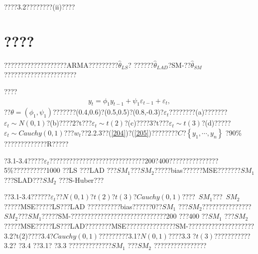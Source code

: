 \documentclass[a4paper,12pt,openany,oneside,utf-8]{ctexbook}
\begin{document}
	\noindent ????3.2????????(ii)????
	
	\section{????}
	
	???????????????????ARMA?????????$\hat{\theta}_{LS}$? ??????$\hat{\theta}_{LAD}$?SM-??$\hat{\theta}_{SM}$ ??????????????????????
	
	????
	\begin{align}\label{343}
		y_{t}=\phi_{1} y_{t-1}+\psi_{1} \varepsilon_{t-1}+\varepsilon_{t},
	\end{align}
	??$\theta=(\phi_{1},\psi_{1})$???????(0.4,0.6)?(0.5,0.5)?(0.8,-0.3)?$\varepsilon_{t}$????????(a)???????$\varepsilon_{t}\sim N(0,1)$?(b)????2?t???$\varepsilon_{t}\sim t(2)$?(c)????3?t???$\varepsilon_{t}\sim t(3)$?(d)?????$\varepsilon_{t}\sim Cauchy(0,1)$???$w_t$??2.2.3??(\ref{204})?(\ref{205})????????$C$?$\left\{y_1,\cdots,y_n\right\}$ ?90\% ?????????????R?????
	
	?3.1-3.4?????$\varepsilon_t$?????????????????????????????200?400???????????????5\%??????????1000 ??LS ???LAD ???$SM_1$???$SM_2$?????bias??????MSE???????$SM_1$???SLAD???$SM_2$ ???S-Huber???
	
	??3.1-3.4??????$\varepsilon_t$??$N(0,1)$?$t(2)$?$t(3)$?$Cauchy(0,1)$????~$SM_1$???~$SM_2$ ?????MSE?????LS???LAD ??????????bias??????0??$SM_1$ ???$SM_2$???????????????$SM_2$???$SM_1$?????SM-?????????????????????????????200 ???400 ??$SM_1$ ???$SM_2$ ?????MSE?????LS???LAD????????MSE???????????????SM-????????????????????3.2?t(2)????3.4?$Cauchy(0,1)$?????????3.1?$N(0,1)$????3.3 ?$t(3)$???????????3.2? ?3.4 ??3.1? ?3.3 ?????????????$SM_1$ ???$SM_2$ ????????????????
	
\end{document}
